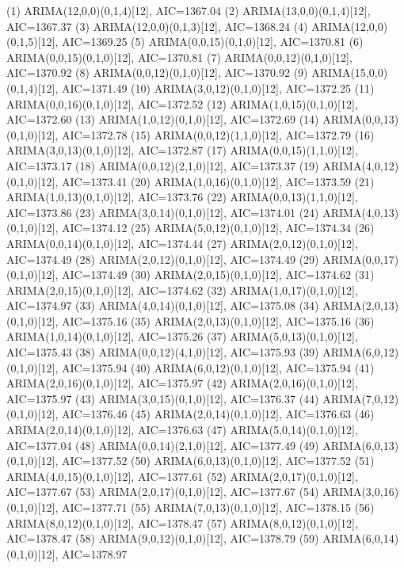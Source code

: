 \documentclass[12pt,letterpaper]{article}   %
\begin{document}
\begin{smallconsole}[caption={Modelos Ordenados por AIC}]
(1) ARIMA(12,0,0)(0,1,4)[12], AIC=1367.04
(2) ARIMA(13,0,0)(0,1,4)[12], AIC=1367.37
(3) ARIMA(12,0,0)(0,1,3)[12], AIC=1368.24
(4) ARIMA(12,0,0)(0,1,5)[12], AIC=1369.25
(5) ARIMA(0,0,15)(0,1,0)[12], AIC=1370.81
(6) ARIMA(0,0,15)(0,1,0)[12], AIC=1370.81
(7) ARIMA(0,0,12)(0,1,0)[12], AIC=1370.92
(8) ARIMA(0,0,12)(0,1,0)[12], AIC=1370.92
(9) ARIMA(15,0,0)(0,1,4)[12], AIC=1371.49
(10) ARIMA(3,0,12)(0,1,0)[12], AIC=1372.25
(11) ARIMA(0,0,16)(0,1,0)[12], AIC=1372.52
(12) ARIMA(1,0,15)(0,1,0)[12], AIC=1372.60
(13) ARIMA(1,0,12)(0,1,0)[12], AIC=1372.69
(14) ARIMA(0,0,13)(0,1,0)[12], AIC=1372.78
(15) ARIMA(0,0,12)(1,1,0)[12], AIC=1372.79
(16) ARIMA(3,0,13)(0,1,0)[12], AIC=1372.87
(17) ARIMA(0,0,15)(1,1,0)[12], AIC=1373.17
(18) ARIMA(0,0,12)(2,1,0)[12], AIC=1373.37
(19) ARIMA(4,0,12)(0,1,0)[12], AIC=1373.41
(20) ARIMA(1,0,16)(0,1,0)[12], AIC=1373.59
(21) ARIMA(1,0,13)(0,1,0)[12], AIC=1373.76
(22) ARIMA(0,0,13)(1,1,0)[12], AIC=1373.86
(23) ARIMA(3,0,14)(0,1,0)[12], AIC=1374.01
(24) ARIMA(4,0,13)(0,1,0)[12], AIC=1374.12
(25) ARIMA(5,0,12)(0,1,0)[12], AIC=1374.34
(26) ARIMA(0,0,14)(0,1,0)[12], AIC=1374.44
(27) ARIMA(2,0,12)(0,1,0)[12], AIC=1374.49
(28) ARIMA(2,0,12)(0,1,0)[12], AIC=1374.49
(29) ARIMA(0,0,17)(0,1,0)[12], AIC=1374.49
(30) ARIMA(2,0,15)(0,1,0)[12], AIC=1374.62
(31) ARIMA(2,0,15)(0,1,0)[12], AIC=1374.62
(32) ARIMA(1,0,17)(0,1,0)[12], AIC=1374.97
(33) ARIMA(4,0,14)(0,1,0)[12], AIC=1375.08
(34) ARIMA(2,0,13)(0,1,0)[12], AIC=1375.16
(35) ARIMA(2,0,13)(0,1,0)[12], AIC=1375.16
(36) ARIMA(1,0,14)(0,1,0)[12], AIC=1375.26
(37) ARIMA(5,0,13)(0,1,0)[12], AIC=1375.43
(38) ARIMA(0,0,12)(4,1,0)[12], AIC=1375.93
(39) ARIMA(6,0,12)(0,1,0)[12], AIC=1375.94
(40) ARIMA(6,0,12)(0,1,0)[12], AIC=1375.94
(41) ARIMA(2,0,16)(0,1,0)[12], AIC=1375.97
(42) ARIMA(2,0,16)(0,1,0)[12], AIC=1375.97
(43) ARIMA(3,0,15)(0,1,0)[12], AIC=1376.37
(44) ARIMA(7,0,12)(0,1,0)[12], AIC=1376.46
(45) ARIMA(2,0,14)(0,1,0)[12], AIC=1376.63
(46) ARIMA(2,0,14)(0,1,0)[12], AIC=1376.63
(47) ARIMA(5,0,14)(0,1,0)[12], AIC=1377.04
(48) ARIMA(0,0,14)(2,1,0)[12], AIC=1377.49
(49) ARIMA(6,0,13)(0,1,0)[12], AIC=1377.52
(50) ARIMA(6,0,13)(0,1,0)[12], AIC=1377.52
(51) ARIMA(4,0,15)(0,1,0)[12], AIC=1377.61
(52) ARIMA(2,0,17)(0,1,0)[12], AIC=1377.67
(53) ARIMA(2,0,17)(0,1,0)[12], AIC=1377.67
(54) ARIMA(3,0,16)(0,1,0)[12], AIC=1377.71
(55) ARIMA(7,0,13)(0,1,0)[12], AIC=1378.15
(56) ARIMA(8,0,12)(0,1,0)[12], AIC=1378.47
(57) ARIMA(8,0,12)(0,1,0)[12], AIC=1378.47
(58) ARIMA(9,0,12)(0,1,0)[12], AIC=1378.79
(59) ARIMA(6,0,14)(0,1,0)[12], AIC=1378.97

\end{smallconsole}
\end{document}
